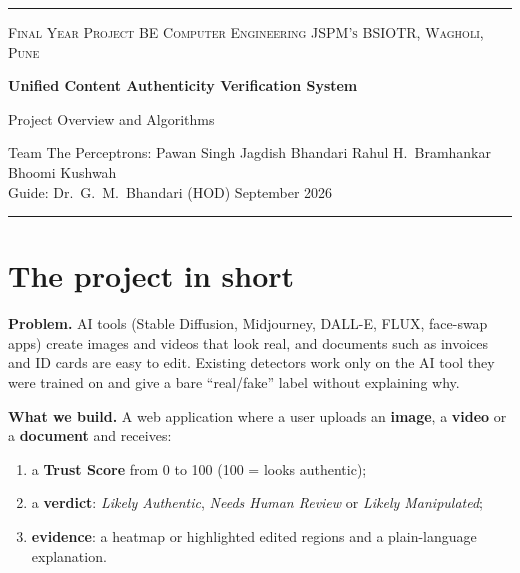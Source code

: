 \documentclass[11pt,a4paper]{article}
\begin{document}
\begin{center}
{\color{cPrimary}\rule{\linewidth}{1pt}}\par\vspace{0.6em}
{\small\color{cAccent}\textsc{Final Year Project \quad\textbar\quad BE Computer Engineering \quad\textbar\quad JSPM's BSIOTR, Wagholi, Pune}}\par\vspace{0.5em}
{\LARGE\bfseries Unified Content Authenticity Verification System\par}
\vspace{0.3em}
{\large\color{cPrimary} Project Overview and Algorithms\par}
\vspace{0.5em}
{\small Team The Perceptrons: Pawan Singh Jagdish Bhandari \textperiodcentered{} Rahul H.\ Bramhankar \textperiodcentered{} Bhoomi Kushwah\\
Guide: Dr.\ G.\ M.\ Bhandari (HOD) \quad\textbar\quad September 2026\par}
\vspace{0.4em}
{\color{cPrimary}\rule{\linewidth}{1pt}}
\end{center}

\section{The project in short}

\textbf{Problem.} AI tools (Stable Diffusion, Midjourney, DALL-E, FLUX, face-swap apps) create images
and videos that look real, and documents such as invoices and ID cards are easy to edit. Existing
detectors work only on the AI tool they were trained on and give a bare ``real/fake'' label without
explaining why.

\textbf{What we build.} A web application where a user uploads an \textbf{image}, a \textbf{video} or a
\textbf{document} and receives:
\begin{enumerate}
  \item a \textbf{Trust Score} from 0 to 100 (100 = looks authentic);
  \item a \textbf{verdict}: \emph{Likely Authentic}, \emph{Needs Human Review} or \emph{Likely Manipulated};
  \item \textbf{evidence}: a heatmap or highlighted edited regions and a plain-language explanation.
\end{enumerate}
\end{document}
